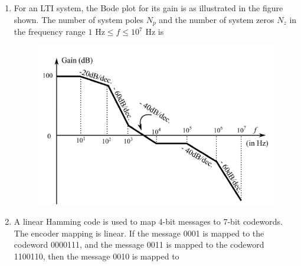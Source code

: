\documentclass[a4paper, 11pt]{article}
\begin{document}
\begin{enumerate}
    \item For an LTI system, the Bode plot for its gain is as illustrated in the figure shown. The number of system poles $N_{p}$ and the number of system zeros $N_{z}$ in the frequency range $1 \text{ Hz} \le f \le 10^{7} \text{ Hz}$ is
    
    \begin{figure}[H]
        \centering
        \includegraphics[width=0.5\columnwidth]{figs/q6.png}
        \caption*{}
        \label{fig:q6}
    \end{figure}
    
    \begin{enumerate}
    \end{enumerate}

    \hfill{}

    \item A linear Hamming code is used to map 4-bit messages to 7-bit codewords. The encoder mapping is linear. If the message 0001 is mapped to the codeword 0000111, and the message 0011 is mapped to the codeword 1100110, then the message 0010 is mapped to
    \begin{enumerate}
    \end{enumerate}


\end{enumerate}
\end{document}

